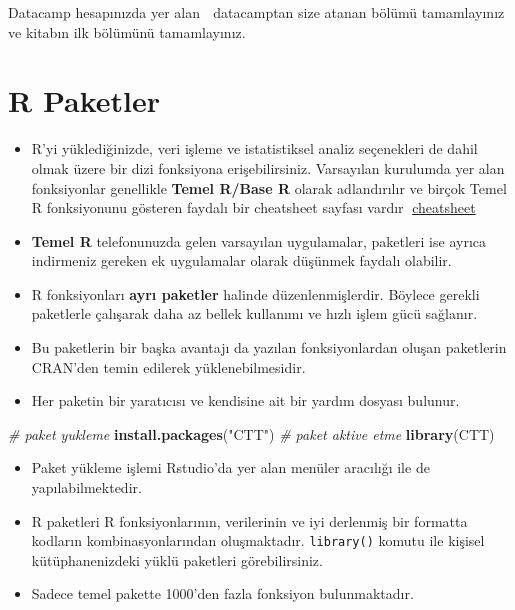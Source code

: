 \documentclass[
  oneside]{book}
\newenvironment{Shaded}{\begin{snugshade}}{\end{snugshade}}
\newcommand{\CommentTok}[1]{\textcolor[rgb]{0.56,0.35,0.01}{\textit{#1}}}
\newcommand{\FunctionTok}[1]{\textcolor[rgb]{0.13,0.29,0.53}{\textbf{#1}}}
\newcommand{\NormalTok}[1]{#1}
\newcommand{\StringTok}[1]{\textcolor[rgb]{0.31,0.60,0.02}{#1}}
\begin{document}
Datacamp hesapınızda yer alan 🔗 datacamptan size atanan bölümü tamamlayınız ve kitabın ilk bölümünü tamamlayınız.

\hypertarget{r-paketler}{%
\chapter{R Paketler}\label{r-paketler}}

\begin{itemize}
\item
  R'yi yüklediğinizde, veri işleme ve istatistiksel analiz seçenekleri de dahil olmak üzere bir dizi fonksiyona erişebilirsiniz. Varsayılan kurulumda yer alan fonksiyonlar genellikle \textbf{Temel R/Base R} olarak adlandırılır ve birçok Temel R fonksiyonunu gösteren faydalı bir cheatsheet sayfası vardır 🔗\href{https://github.com/rstudio/cheatsheets/raw/main/base-r.pdf}{cheatsheet}
\item
  \textbf{Temel R} telefonunuzda gelen varsayılan uygulamalar, paketleri ise ayrıca indirmeniz gereken ek uygulamalar olarak düşünmek faydalı olabilir.
\item
  R fonksiyonları \textbf{ayrı paketler} halinde düzenlenmişlerdir. Böylece gerekli paketlerle çalışarak daha az bellek kullanımı ve hızlı işlem gücü sağlanır.
\item
  Bu paketlerin bir başka avantajı da yazılan fonksiyonlardan oluşan paketlerin CRAN'den temin edilerek yüklenebilmesidir.
\item
  Her paketin bir yaratıcısı ve kendisine ait bir yardım dosyası bulunur.
\end{itemize}

\begin{Shaded}
\begin{Highlighting}[]
\CommentTok{\# paket yukleme}
\FunctionTok{install.packages}\NormalTok{(}\StringTok{"CTT"}\NormalTok{)}
\CommentTok{\# paket aktive etme}
\FunctionTok{library}\NormalTok{(CTT)}
\end{Highlighting}
\end{Shaded}

\begin{itemize}
\item
  Paket yükleme işlemi Rstudio'da yer alan menüler aracılığı ile de yapılabilmektedir.
\item
  R paketleri R fonksiyonlarının, verilerinin ve iyi derlenmiş bir formatta kodların kombinasyonlarından oluşmaktadır. \texttt{library()} komutu ile kişisel kütüphanenizdeki yüklü paketleri görebilirsiniz.
\item
  Sadece temel pakette 1000'den fazla fonksiyon bulunmaktadır.
\end{itemize}
\end{document}
